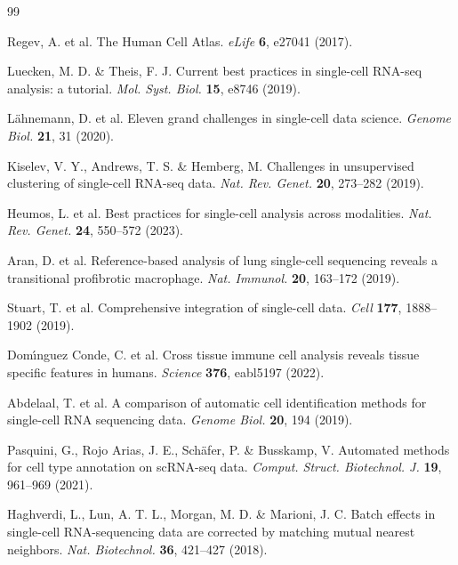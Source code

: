 \documentclass[11pt]{article}
\begin{document}
\renewcommand{\refname}{Supplementary References}
\begin{thebibliography}{99}

Regev, A. et al. The Human Cell Atlas. \textit{eLife} \textbf{6}, e27041 (2017).

Luecken, M. D. \& Theis, F. J. Current best practices in single-cell RNA-seq analysis: a tutorial. \textit{Mol. Syst. Biol.} \textbf{15}, e8746 (2019).

L\"ahnemann, D. et al. Eleven grand challenges in single-cell data science. \textit{Genome Biol.} \textbf{21}, 31 (2020).

Kiselev, V. Y., Andrews, T. S. \& Hemberg, M. Challenges in unsupervised clustering of single-cell RNA-seq data. \textit{Nat. Rev. Genet.} \textbf{20}, 273--282 (2019).

Heumos, L. et al. Best practices for single-cell analysis across modalities. \textit{Nat. Rev. Genet.} \textbf{24}, 550--572 (2023).

Aran, D. et al. Reference-based analysis of lung single-cell sequencing reveals a transitional profibrotic macrophage. \textit{Nat. Immunol.} \textbf{20}, 163--172 (2019).

Stuart, T. et al. Comprehensive integration of single-cell data. \textit{Cell} \textbf{177}, 1888--1902 (2019).

Dom\'{\i}nguez Conde, C. et al. Cross tissue immune cell analysis reveals tissue specific features in humans. \textit{Science} \textbf{376}, eabl5197 (2022).

Abdelaal, T. et al. A comparison of automatic cell identification methods for single-cell RNA sequencing data. \textit{Genome Biol.} \textbf{20}, 194 (2019).

Pasquini, G., Rojo Arias, J. E., Sch\"afer, P. \& Busskamp, V. Automated methods for cell type annotation on scRNA-seq data. \textit{Comput. Struct. Biotechnol. J.} \textbf{19}, 961--969 (2021).

Haghverdi, L., Lun, A. T. L., Morgan, M. D. \& Marioni, J. C. Batch effects in single-cell RNA-sequencing data are corrected by matching mutual nearest neighbors. \textit{Nat. Biotechnol.} \textbf{36}, 421--427 (2018).


\end{thebibliography}
\end{document}
